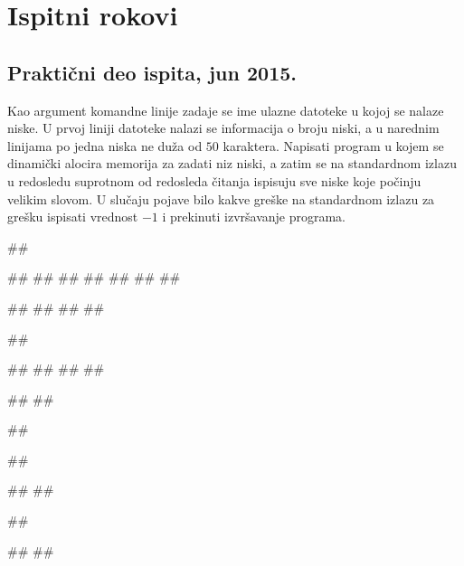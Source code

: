 \appendix
\chapter{Ispitni rokovi}

\section{Praktični deo ispita, jun 2015.}

\begin{Exercise}[label=A_01]
Kao argument komandne linije zadaje se ime ulazne datoteke u kojoj se nalaze niske. U prvoj liniji datoteke nalazi se informacija o broju niski, a u narednim linijama po jedna niska ne duža od $50$ karaktera. Napisati program u kojem se dinamički alocira memorija za zadati niz niski, a zatim se na standardnom izlazu u redosledu suprotnom od redosleda čitanja ispisuju sve niske koje počinju velikim slovom. U slučaju pojave bilo kakve greške na standardnom izlazu za grešku ispisati vrednost $-1$ i prekinuti izvršavanje programa.

\begin{miditest}
\begin{test}{1}
##

##
##
##
##
##
##
##
  
#\naslovIzlaz#
##
##
##
\end{test}
\end{miditest}
\begin{minitest}
\begin{test}{2}
##

##
##
##
##

#\naslovIzlaz#
#\izlaz{}#
\end{test}
\end{minitest}


\begin{miditest}
\begin{test}{3}
##

##

#\naslovIzlazZaGresku#
##
\end{test}
\end{miditest}
\begin{miditest}
\begin{test}{4}
##

#\naslovIzlazZaGresku#
##
\end{test}
\end{miditest}

\end{Exercise}
\begin{Answer}[ref=A_01]
\end{Answer}


